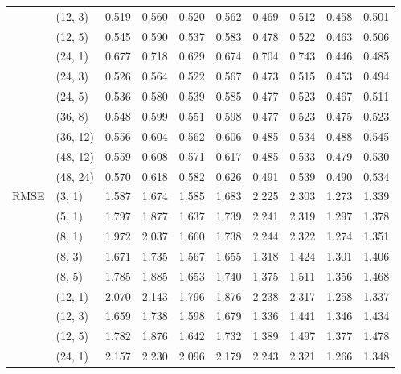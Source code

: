 \begin{longtable}{ll|rr|rr|rr|rr}
      & (12, 3) &     0.519 &      0.560 &   0.520 &    0.562 &    0.469 &     0.512 &  0.458 &   0.501 \\
      & (12, 5) &     0.545 &      0.590 &   0.537 &    0.583 &    0.478 &     0.522 &  0.463 &   0.506 \\
      & (24, 1) &     0.677 &      0.718 &   0.629 &    0.674 &    0.704 &     0.743 &  0.446 &   0.485 \\
      & (24, 3) &     0.526 &      0.564 &   0.522 &    0.567 &    0.473 &     0.515 &  0.453 &   0.494 \\
      & (24, 5) &     0.536 &      0.580 &   0.539 &    0.585 &    0.477 &     0.523 &  0.467 &   0.511 \\
      & (36, 8) &     0.548 &      0.599 &   0.551 &    0.598 &    0.477 &     0.523 &  0.475 &   0.523 \\
      & (36, 12) &     0.556 &      0.604 &   0.562 &    0.606 &    0.485 &     0.534 &  0.488 &   0.545 \\
      & (48, 12) &     0.559 &      0.608 &   0.571 &    0.617 &    0.485 &     0.533 &  0.479 &   0.530 \\
      & (48, 24) &     0.570 &      0.618 &   0.582 &    0.626 &    0.491 &     0.539 &  0.490 &   0.534 \\
\hline \multirow{15}{*}{RMSE} & (3, 1) &     1.587 &      1.674 &   1.585 &    1.683 &    2.225 &     2.303 &  1.273 &   1.339 \\
      & (5, 1) &     1.797 &      1.877 &   1.637 &    1.739 &    2.241 &     2.319 &  1.297 &   1.378 \\
      & (8, 1) &     1.972 &      2.037 &   1.660 &    1.738 &    2.244 &     2.322 &  1.274 &   1.351 \\
      & (8, 3) &     1.671 &      1.735 &   1.567 &    1.655 &    1.318 &     1.424 &  1.301 &   1.406 \\
      & (8, 5) &     1.785 &      1.885 &   1.653 &    1.740 &    1.375 &     1.511 &  1.356 &   1.468 \\
      & (12, 1) &     2.070 &      2.143 &   1.796 &    1.876 &    2.238 &     2.317 &  1.258 &   1.337 \\
      & (12, 3) &     1.659 &      1.738 &   1.598 &    1.679 &    1.336 &     1.441 &  1.346 &   1.434 \\
      & (12, 5) &     1.782 &      1.876 &   1.642 &    1.732 &    1.389 &     1.497 &  1.377 &   1.478 \\
      & (24, 1) &     2.157 &      2.230 &   2.096 &    2.179 &    2.243 &     2.321 &  1.266 &   1.348 \\

\end{longtable}
